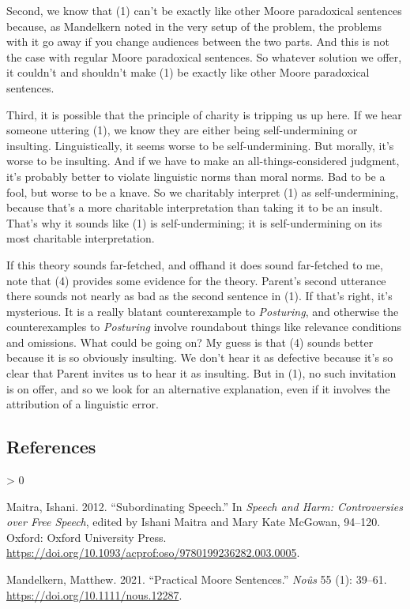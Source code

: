 \documentclass[
  12pt,
]{article}
\newlength{\cslhangindent}
\newenvironment{CSLReferences}[2] %
 {%
  \setlength{\parindent}{0pt}
  \ifodd #1 \everypar{\setlength{\hangindent}{\cslhangindent}}\ignorespaces\fi
  \ifnum #2 > 0
  \setlength{\parskip}{#2\baselineskip}
  \fi
 }%
 {}
\begin{document}
Second, we know that (1) can't be exactly like other Moore paradoxical
sentences because, as Mandelkern noted in the very setup of the problem,
the problems with it go away if you change audiences between the two
parts. And this is not the case with regular Moore paradoxical
sentences. So whatever solution we offer, it couldn't and shouldn't make
(1) be exactly like other Moore paradoxical sentences.

Third, it is possible that the principle of charity is tripping us up
here. If we hear someone uttering (1), we know they are either being
self-undermining or insulting. Linguistically, it seems worse to be
self-undermining. But morally, it's worse to be insulting. And if we
have to make an all-things-considered judgment, it's probably better to
violate linguistic norms than moral norms. Bad to be a fool, but worse
to be a knave. So we charitably interpret (1) as self-undermining,
because that's a more charitable interpretation than taking it to be an
insult. That's why it sounds like (1) is self-undermining; it is
self-undermining on its most charitable interpretation.

If this theory sounds far-fetched, and offhand it does sound far-fetched
to me, note that (4) provides some evidence for the theory. Parent's
second utterance there sounds not nearly as bad as the second sentence
in (1). If that's right, it's mysterious. It is a really blatant
counterexample to \emph{Posturing}, and otherwise the counterexamples to
\emph{Posturing} involve roundabout things like relevance conditions and
omissions. What could be going on? My guess is that (4) sounds better
because it is so obviously insulting. We don't hear it as defective
because it's so clear that Parent invites us to hear it as insulting.
But in (1), no such invitation is on offer, and so we look for an
alternative explanation, even if it involves the attribution of a
linguistic error.

\hypertarget{references}{%
\subsection*{References}\label{references}}

\hypertarget{refs}{}
\begin{CSLReferences}{1}{0}
\leavevmode\hypertarget{ref-Maitra2012}{}%
Maitra, Ishani. 2012. {``Subordinating Speech.''} In \emph{Speech and
Harm: Controversies over Free Speech}, edited by Ishani Maitra and Mary
Kate McGowan, 94--120. Oxford: Oxford University Press.
\url{https://doi.org/10.1093/acprof:oso/9780199236282.003.0005}.

\leavevmode\hypertarget{ref-Mandelkern2021}{}%
Mandelkern, Matthew. 2021. {``Practical Moore Sentences.''}
\emph{No{û}s} 55 (1): 39--61. \url{https://doi.org/10.1111/nous.12287}.

\end{CSLReferences}
\end{document}

